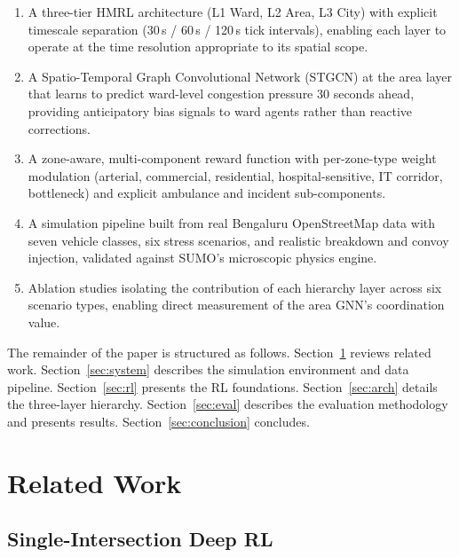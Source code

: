 \documentclass[conference]{IEEEtran}
\begin{document}
\begin{enumerate}
    \item A three-tier HMRL architecture (L1 Ward, L2 Area, L3 City) with
    explicit timescale separation (30\,s / 60\,s / 120\,s tick intervals),
    enabling each layer to operate at the time resolution appropriate to its
    spatial scope.

    \item A Spatio-Temporal Graph Convolutional Network (STGCN) at the area
    layer that learns to predict ward-level congestion pressure 30 seconds
    ahead, providing anticipatory bias signals to ward agents rather than
    reactive corrections.

    \item A zone-aware, multi-component reward function with per-zone-type
    weight modulation (arterial, commercial, residential, hospital-sensitive,
    IT corridor, bottleneck) and explicit ambulance and incident sub-components.

    \item A simulation pipeline built from real Bengaluru OpenStreetMap data
    with seven vehicle classes, six stress scenarios, and realistic breakdown
    and convoy injection, validated against SUMO's microscopic physics engine.

    \item Ablation studies isolating the contribution of each hierarchy layer
    across six scenario types, enabling direct measurement of the area GNN's
    coordination value.
\end{enumerate}

The remainder of the paper is structured as follows. Section~\ref{sec:related}
reviews related work. Section~\ref{sec:system} describes the simulation
environment and data pipeline. Section~\ref{sec:rl} presents the RL foundations.
Section~\ref{sec:arch} details the three-layer hierarchy. Section~\ref{sec:eval}
describes the evaluation methodology and presents results.
Section~\ref{sec:conclusion} concludes.

\section{Related Work}
\label{sec:related}

\subsection{Single-Intersection Deep RL}
\end{document}
